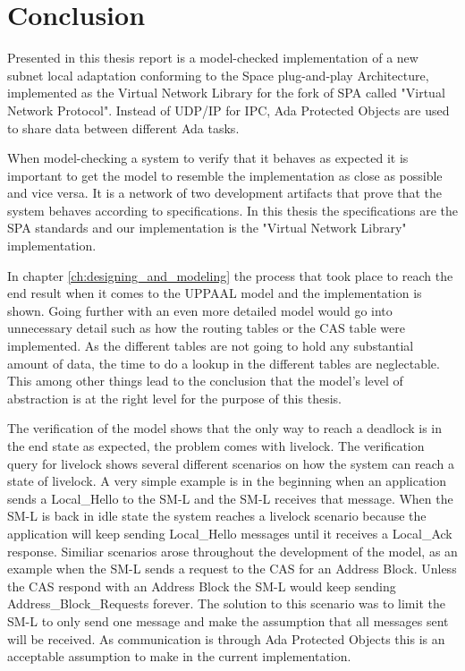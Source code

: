 \chapter{Conclusion}\label{ch:conclusion}
Presented in this thesis report is a model-checked implementation of a new
subnet local adaptation conforming to the Space plug-and-play Architecture,
implemented as the Virtual Network Library \cite{web:github-vn-lib} for the
fork of SPA called "Virtual Network Protocol". Instead of UDP/IP for IPC, Ada
Protected Objects are used to share data between different Ada tasks.

When model-checking a system to verify that it behaves as expected it is
important to get the model to resemble the implementation as close as possible
and vice versa. It is a network of two development artifacts that prove that the
system behaves according to specifications. In this thesis the specifications
are the SPA standards and our implementation is the "Virtual Network Library"
implementation.

In chapter \ref{ch:designing_and_modeling} the process that took place to reach
the end result when it comes to the UPPAAL model and the implementation is
shown. Going further with an even more detailed model would go into
unnecessary detail such as how the routing tables or the CAS table were
implemented. As the different tables are not going to hold any substantial
amount of data, the time to do a lookup in the different tables are
neglectable. This among other things lead to the conclusion that the model's
level of abstraction is at the right level for the purpose of this thesis.

The verification of the model shows that the only way to reach a deadlock is in
the end state as expected, the problem comes with livelock. The
verification query for livelock shows several different scenarios on how the
system can reach a state of livelock. A very simple example is in the beginning
when an application sends a Local\_Hello to the SM-L and the SM-L receives that
message. When the SM-L is back in idle state the system reaches a livelock
scenario because the application will keep sending Local\_Hello messages
until it receives a Local\_Ack response. Similiar scenarios arose throughout
the development of the model, as an example when the SM-L sends a request to
the CAS for an Address Block. Unless the CAS respond with an Address Block the
SM-L would keep sending Address\_Block\_Requests forever. The solution to this
scenario was to limit the SM-L to only send one message and make the
assumption that all messages sent will be received. As communication is through
Ada Protected Objects this is an acceptable assumption to make in the current
implementation.

